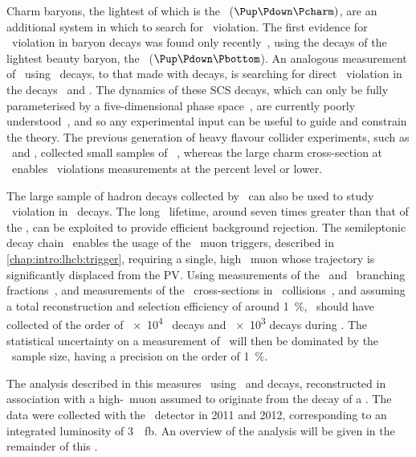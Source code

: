 
Charm baryons, the lightest of which is the \PLambdac~($\Pup\Pdown\Pcharm)$,
are an additional system in which to search for \CP\ violation.
The first evidence for \CP\ violation in baryon decays was found only
recently~\cite{Aaij:2016cla}, using the decays of the lightest beauty baryon,
the \PLambdab~($\Pup\Pdown\Pbottom$).
An analogous measurement of \dACP\ using \PLambdac\ decays, to that made with
\PDzero decays, is searching for direct \CP\ violation in the decays \LcTopKK\
and \LcToppipi.
The dynamics of these \ac{SCS} decays, which can only be fully parameterised by
a five-dimensional phase space~\cite{Aitala:1999uq}, are currently poorly
understood~\cite{Bigi:2012ev,PDG2014}, and so any experimental input can be
useful to guide and constrain the theory.
The previous generation of heavy flavour collider experiments, such as \belle\
and \babar, collected small samples of \PLambdac~\cite{Seuster:2005tr}, whereas
the large charm cross-section at \lhcb\ enables \CP\ violations measurements at
the percent level or lower.

The large sample of \Pbottom hadron decays collected by \lhcb\ can also be used
to study \CP\ violation in \PLambdac\ decays.
The long \PLambdab\ lifetime, around seven times greater than that of the
\PLambdac, can be exploited to provide efficient background rejection.
The semileptonic decay chain \LbToLcmuX\ enables the usage of the \lhcb\ muon
triggers, described in \cref{chap:intro:lhcb:trigger}, requiring a single, high
\pT\ muon whose trajectory is significantly displaced from the \ac{PV}.
Using measurements of the \LbToLcmuX\ and \LcTophh\ branching
fractions~\cite{PDG2014,Ablikim:2016tze}, and measurements of the \PLambdab\
cross-sections in \pp\ collisions~\cite{Aaij:2015fea}, and assuming a total
reconstruction and selection efficiency of around \SI{1}{\percent}, \lhcb\
should have collected of the order of \num{e4} \ppipi\ decays and \num{e3} \pKK
decays during \runone.
The statistical uncertainty on a measurement of \dACP\ will then be dominated
by the \pKK\ sample size, having a precision on the order of
\SI{1}{\percent}.

The analysis described in this \lcnamecref{chap:cpv} measures \dACP\ using
\LcTopKK\ and \LcToppipi decays, reconstructed in association with a high-\pT\
muon assumed to originate from the decay of a \PLambdab.
The data were collected with the \lhcb\ detector in 2011 and 2012,
corresponding to an integrated luminosity of \SI{3}{\per\femto\barn}.
An overview of the analysis will be given in the remainder of this
\lcnamecref{chap:cpv:introduction}.

